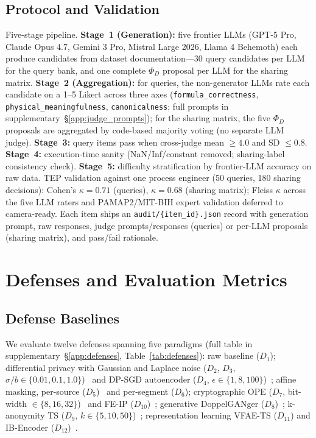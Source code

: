 \documentclass{article}
\theoremstyle{remark}
\begin{document}
\subsection{Protocol and Validation}
Five-stage pipeline. \textbf{Stage~1 (Generation):} five frontier LLMs (GPT-5 Pro, Claude Opus 4.7, Gemini 3 Pro, Mistral Large 2026, Llama 4 Behemoth) each produce candidates from dataset documentation---30 query candidates per LLM for the query bank, and one complete $\Phi_D$ proposal per LLM for the sharing matrix. \textbf{Stage~2 (Aggregation):} for queries, the non-generator LLMs rate each candidate on a 1--5 Likert across three axes (\texttt{formula\_correctness}, \texttt{physical\_meaningfulness}, \texttt{canonicalness}; full prompts in supplementary~\S\ref{app:judge_prompts}); for the sharing matrix, the five $\Phi_D$ proposals are aggregated by code-based majority voting (no separate LLM judge). \textbf{Stage~3:} query items pass when cross-judge mean $\ge 4.0$ and SD $\le 0.8$. \textbf{Stage~4:} execution-time sanity (NaN/Inf/constant removed; sharing-label consistency check). \textbf{Stage~5:} difficulty stratification by frontier-LLM accuracy on raw data. TEP validation against one process engineer (50 queries, 180 sharing decisions): Cohen's $\kappa = 0.71$ (queries), $\kappa = 0.68$ (sharing matrix); Fleiss $\kappa$ across the five LLM raters and PAMAP2/MIT-BIH expert validation deferred to camera-ready. Each item ships an \texttt{audit/\{item\_id\}.json} record with generation prompt, raw responses, judge prompts/responses (queries) or per-LLM proposals (sharing matrix), and pass/fail rationale.

\section{Defenses and Evaluation Metrics}
\label{sec:defenses}

\subsection{Defense Baselines}
We evaluate twelve defenses spanning five paradigms (full table in supplementary~\S\ref{app:defenses}, Table~\ref{tab:defenses}): raw baseline ($D_1$); differential privacy with Gaussian and Laplace noise ($D_2$, $D_3$, $\sigma/b \in \{0.01, 0.1, 1.0\}$)~\cite{dwork2006} and DP-SGD autoencoder ($D_4$, $\epsilon \in \{1, 8, 100\}$)~\cite{abadi2016}; affine masking, per-source ($D_5$)~\cite{binfet2024} and per-segment ($D_6$); cryptographic OPE ($D_7$, bit-width $\in \{8, 16, 32\}$)~\cite{boldyreva2009} and FE-IP ($D_{10}$)~\cite{abdalla2015}; generative DoppelGANger ($D_8$)~\cite{doppelganger}; k-anonymity TS ($D_9$, $k \in \{5, 10, 50\}$)~\cite{abul2008}; representation learning VFAE-TS ($D_{11}$) and IB-Encoder ($D_{12}$)~\cite{tishby1999}.
\end{document}
